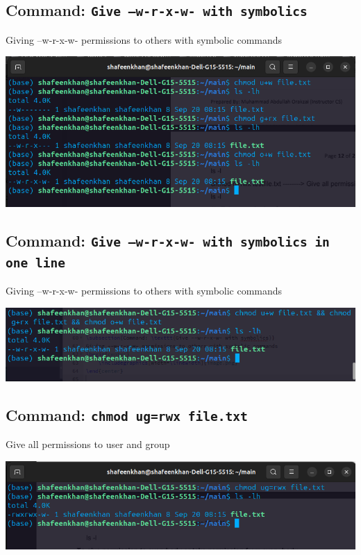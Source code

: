 \documentclass[a4paper,12pt]{article}
\begin{document}
\subsection{Command: \texttt{Give --w-r-x-w- with symbolics}}
Giving --w-r-x-w- permissions to others with symbolic commands
\begin{center}
    \includegraphics[width=\linewidth]{image.png}
\end{center}

\subsection{Command: \texttt{Give --w-r-x-w- with symbolics in one line }}
Giving --w-r-x-w- permissions to others with symbolic commands
\begin{center}
    \includegraphics[width=\linewidth]{Screenshot from 2024-09-20 09-13-53.png}
\end{center}


\subsection{Command: \texttt{chmod ug=rwx file.txt}}
Give all permissions to user and group
\begin{center}
    \includegraphics[width=\linewidth]{Screenshot from 2024-09-20 09-15-11.png}
\end{center}
\end{document}
